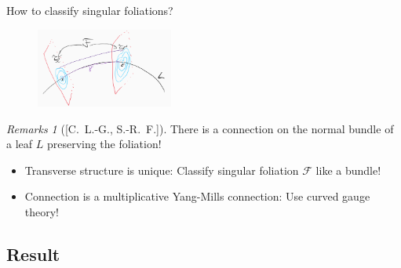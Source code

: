 \documentclass[
aspectratio=3218, 
10pt
]{beamer}
\theoremstyle{plain}
\theoremstyle{remark}
\newtheorem*{remark}{Remarks}
\begin{document}
{\begin{frame}{How to classify singular foliations?}
\begin{figure}[htbp]
	\centering
		\includegraphics[width=0.4\textwidth]{Foliation connection.png}
	\label{fig:Foliation connection Zwei}
\end{figure}

\begin{remark}[{[C.\ L.-G., S.-R.\ F.]}]
There is a connection on the normal bundle of a leaf $L$ preserving the foliation!
\begin{itemize}
	\item Transverse structure is unique: Classify singular foliation $\mathcal{F}$ like a bundle!
	\item Connection is a multiplicative Yang-Mills connection: Use curved gauge theory!
\end{itemize}
\end{remark}

\end{frame}

\subsection{Result}
{


}}
\end{document}
